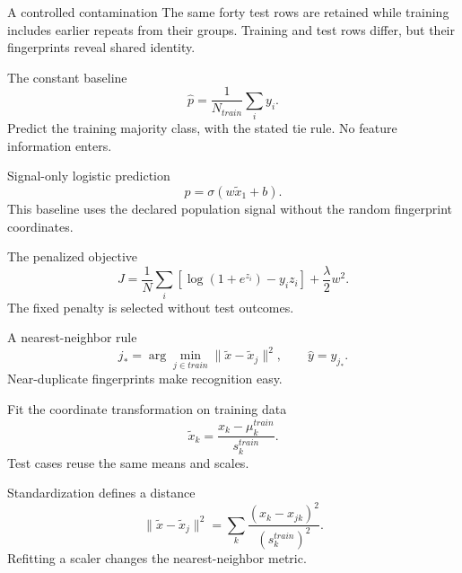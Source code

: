 \documentclass[aspectratio=169,11pt]{beamer}
\newcommand{\notestarget}{notes.pdf}\newcommand{\noteslabel}{Notes}
\begin{document}
\begin{frame}[t,fragile,label=slide-a-controlled-contamination]{A controlled contamination}
The same forty test rows are retained while training includes earlier repeats from their groups.\pause{} Training and test rows differ, but their fingerprints reveal shared identity.
\end{frame}
\renewcommand{\notestarget}{notes.pdf\#note-constant-logistic-and-nearest-neighbor-baselines}
\begin{frame}[t,fragile,label=slide-the-constant-baseline]{The constant baseline}
\[\widehat p=\frac1{N_{train}}\sum_i y_i.\]\pause{} Predict the training majority class, with the stated tie rule. No feature information enters.
\end{frame}
\renewcommand{\notestarget}{notes.pdf\#note-constant-logistic-and-nearest-neighbor-baselines}
\begin{frame}[t,fragile,label=slide-signal-only-logistic-prediction]{Signal-only logistic prediction}
\[p=\sigma(w\widetilde x_1+b).\]\pause{} This baseline uses the declared population signal without the random fingerprint coordinates.
\end{frame}
\renewcommand{\notestarget}{notes.pdf\#note-constant-logistic-and-nearest-neighbor-baselines}
\begin{frame}[t,fragile,label=slide-the-penalized-objective]{The penalized objective}
\[J=\frac1N\sum_i[\log(1+e^{z_i})-y_i z_i]+\frac\lambda2w^2.\]\pause{} The fixed penalty is selected without test outcomes.
\end{frame}
\renewcommand{\notestarget}{notes.pdf\#note-constant-logistic-and-nearest-neighbor-baselines}
\begin{frame}[t,fragile,label=slide-a-nearest-neighbor-rule]{A nearest-neighbor rule}
\[j_* =\arg\min_{j\in train}\|\widetilde x-\widetilde x_j\|^2,\qquad\widehat y=y_{j_*}.\]\pause{} Near-duplicate fingerprints make recognition easy.
\end{frame}
\renewcommand{\notestarget}{notes.pdf\#note-training-dependent-transformations}
\begin{frame}[t,fragile,label=slide-fit-the-coordinate-transformation-on-training-data]{Fit the coordinate transformation on training data}
\[\widetilde x_k=\frac{x_k-\mu_k^{train}}{s_k^{train}}.\]\pause{} Test cases reuse the same means and scales.
\end{frame}
\renewcommand{\notestarget}{notes.pdf\#note-training-dependent-transformations}
\begin{frame}[t,fragile,label=slide-standardization-defines-a-distance]{Standardization defines a distance}
\[\|\widetilde x-\widetilde x_j\|^2=\sum_k\frac{(x_k-x_{jk})^2}{(s_k^{train})^2}.\]\pause{} Refitting a scaler changes the nearest-neighbor metric.
\end{frame}
\end{document}
